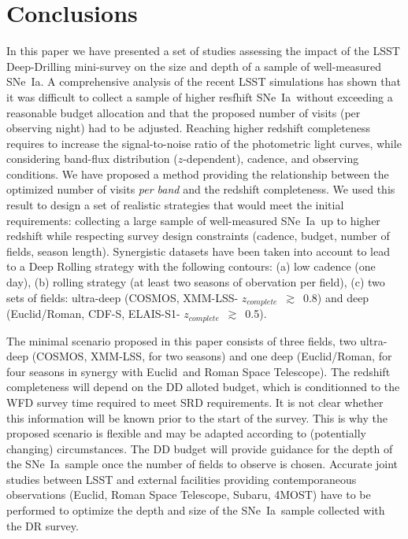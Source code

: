 \documentclass[skiphelvet,twocolumn]{aastex63}
\newcommand{\cosmos}{{COSMOS}}
\newcommand{\elais}{{ELAIS-S1}}
\newcommand{\xmm}{{XMM-LSS}}
\newcommand{\cdfs}{{CDF-S}}
\newcommand{\adfs}{{Euclid/Roman}}
\newcommand{\euclid}{{Euclid}}
\newcommand{\romanspace}{{Roman Space Telescope}}
\newcommand{\sne}{{SNe~Ia}}
\newcommand{\zcomp}{\mbox{$z_{complete}$}}
\begin{document}
\section{Conclusions}
\label{sec:conclusion}
In this paper we have presented a set of studies assessing the impact of the LSST Deep-Drilling mini-survey on the size and depth of a sample of well-measured \sne. A comprehensive analysis of the recent LSST simulations has shown that it was difficult to collect a sample of higher resfhift \sne~without exceeding a reasonable budget allocation and that the proposed number of visits (per observing night) had to be adjusted. Reaching higher redshift completeness requires to increase the signal-to-noise ratio of the photometric light curves, while considering band-flux distribution ($z$-dependent), cadence, and observing conditions. We have proposed a method providing the relationship between the optimized number of visits {\it per band}  and the redshift completeness. We used this result to design a set of realistic strategies that would meet the initial requirements: collecting a large sample of well-measured \sne~up to higher redshift while respecting survey design constraints (cadence, budget, number of fields, season length). Synergistic datasets have been taken into account to lead to a Deep Rolling strategy with the following contours: (a) low cadence (one day), (b) rolling strategy (at least two seasons of obervation per field), (c) two sets of fields: ultra-deep (\cosmos, \xmm - \zcomp~$\gtrsim$~0.8) and deep (\adfs, \cdfs, \elais - \zcomp~$\gtrsim$~0.5).
\par
The minimal scenario proposed in this paper consists of three fields, two ultra-deep (\cosmos, \xmm, for two seasons) and one deep (\adfs, for four seasons in synergy with \euclid~and \romanspace). The redshift completeness will depend on the DD alloted budget, which is conditionned to the WFD survey time required to meet SRD requirements. It is not clear whether this information will be known prior to the start of the survey. This is why the proposed scenario is flexible and may be adapted according to (potentially changing) circumstances. The DD budget will provide guidance for the depth of the \sne~sample once the number of fields to observe is chosen. Accurate joint studies between LSST and external facilities providing contemporaneous observations (\euclid, \romanspace, Subaru, 4MOST) have to be performed to optimize the depth and size of the \sne~sample collected with the DR survey.
\end{document}
